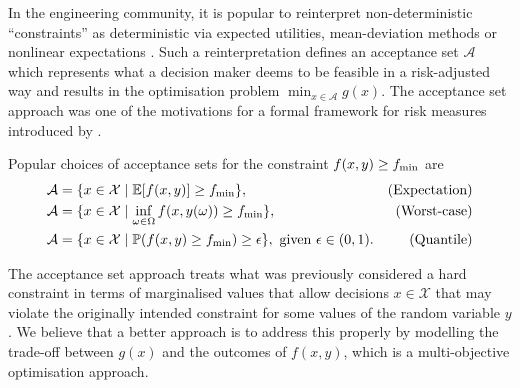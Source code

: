 \documentclass[main.tex]{subfiles}
\begin{document}
In the engineering community, it is popular to
reinterpret non-deterministic ``constraints'' as deterministic via
expected utilities, mean-deviation methods or nonlinear
expectations
\citep{rockafellar2007coherent,rockafellar2015engineering}.
Such a reinterpretation defines an acceptance set $\mathcal{A}$
which represents what a decision maker deems to be feasible in a
risk-adjusted way and results in the optimisation problem
$\min_{x\in\mathcal{A}} g(x)$.
The acceptance set approach was one of the motivations for a formal
framework for risk measures introduced by \citet{artzner1999coherent}.
\begin{example}
  Popular choices of acceptance sets for the constraint $f(x,y)\geq
  f_{\textnormal{min}}$ are
  \begin{align}
    \mathcal{A}&=\{x\in\mathcal{X} \mid
                 \mathbb{E}[f(x,y)]\geq f_{\textnormal{min}}\},
    &\textnormal{(Expectation)}\\
    \mathcal{A}&=\{x\in\mathcal{X} \mid
                 \inf_{\omega\in\Omega}f(x,y(\omega))\geq
                 f_{\textnormal{min}}\},
    &\textnormal{(Worst-case)}\\
    \mathcal{A} &= \{x\in\mathcal{X}\mid
                  \mathbb{P}(f(x,y)\geq f_{\textnormal{min}})\geq \epsilon\},
                  \text{ given }\epsilon\in(0,1).
    &\textnormal{(Quantile)}
  \end{align}
\end{example}

The acceptance set approach treats what was previously considered a
hard constraint in terms of marginalised values that allow decisions $x\in\mathcal{X}$
that may violate the originally intended constraint for some values of the random
variable $y$. We believe that a better approach is to address this
properly by modelling the trade-off between $g(x)$ and the outcomes of $f(x,y)$,
which is a multi-objective optimisation approach.
\end{document}

